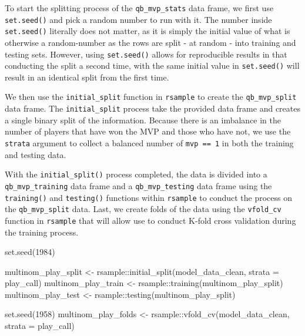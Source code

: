 \documentclass[
  letterpaper,
]{krantz}
\newenvironment{Shaded}{\begin{snugshade}}{\end{snugshade}}
\newcommand{\AttributeTok}[1]{\textcolor[rgb]{0.40,0.45,0.13}{#1}}
\newcommand{\DecValTok}[1]{\textcolor[rgb]{0.68,0.00,0.00}{#1}}
\newcommand{\FunctionTok}[1]{\textcolor[rgb]{0.28,0.35,0.67}{#1}}
\newcommand{\NormalTok}[1]{\textcolor[rgb]{0.00,0.23,0.31}{#1}}
\newcommand{\OtherTok}[1]{\textcolor[rgb]{0.00,0.23,0.31}{#1}}
\newcommand{\SpecialCharTok}[1]{\textcolor[rgb]{0.37,0.37,0.37}{#1}}
\begin{document}
To start the splitting process of the \texttt{qb\_mvp\_stats} data
frame, we first use \texttt{set.seed()} and pick a random number to run
with it. The number inside \texttt{set.seed()} literally does not
matter, as it is simply the initial value of what is otherwise a
random-number as the rows are split - at random - into training and
testing sets. However, using \texttt{set.seed()} allows for reproducible
results in that conducting the split a second time, with the same
initial value in \texttt{set.seed()} will result in an identical split
from the first time.

We then use the \texttt{initial\_split} function in \texttt{rsample} to
create the \texttt{qb\_mvp\_split} data frame. The
\texttt{initial\_split} process take the provided data frame and creates
a single binary split of the information. Because there is an imbalance
in the number of players that have won the MVP and those who have not,
we use the \texttt{strata} argument to collect a balanced number of
\texttt{mvp\ ==\ 1} in both the training and testing data.

With the \texttt{initial\_split()} process completed, the data is
divided into a \texttt{qb\_mvp\_training} data frame and a
\texttt{qb\_mvp\_testing} data frame using the \texttt{training()} and
\texttt{testing()} functions within \texttt{rsample} to conduct the
process on the \texttt{\textasciigrave{}qb\_mvp\_split\textasciigrave{}}
data. Last, we create folds of the data using the \texttt{vfold\_cv}
function in \texttt{rsample} that will allow use to conduct K-fold cross
validation during the training process.

\begin{Shaded}
\begin{Highlighting}[]
\FunctionTok{set.seed}\NormalTok{(}\DecValTok{1984}\NormalTok{)}

\NormalTok{multinom\_play\_split }\OtherTok{\textless{}{-}}\NormalTok{ rsample}\SpecialCharTok{::}\FunctionTok{initial\_split}\NormalTok{(model\_data\_clean,}
                                              \AttributeTok{strata =}\NormalTok{ play\_call)}
\NormalTok{multinom\_play\_train }\OtherTok{\textless{}{-}}\NormalTok{ rsample}\SpecialCharTok{::}\FunctionTok{training}\NormalTok{(multinom\_play\_split)}
\NormalTok{multinom\_play\_test }\OtherTok{\textless{}{-}}\NormalTok{ rsample}\SpecialCharTok{::}\FunctionTok{testing}\NormalTok{(multinom\_play\_split)}

\FunctionTok{set.seed}\NormalTok{(}\DecValTok{1958}\NormalTok{)}
\NormalTok{multinom\_play\_folds }\OtherTok{\textless{}{-}}\NormalTok{ rsample}\SpecialCharTok{::}\FunctionTok{vfold\_cv}\NormalTok{(model\_data\_clean,}
                                         \AttributeTok{strata =}\NormalTok{ play\_call)}
\end{Highlighting}
\end{Shaded}
\end{document}
